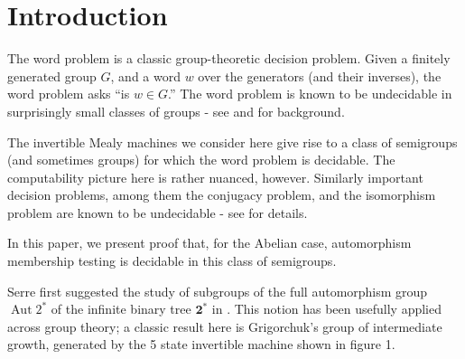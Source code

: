 \documentclass[11pt, titlepage]{article}
\begin{document}
\pagestyle{plain}
\title{\rmfamily\normalfont{}} \author{} \date{May 5, 2017}

\maketitle

\begin{abstract}
  We consider a variety of decision problems in groups and semigroups
  induced by invertible Mealy machines. Notably, we present proof
  that, in the Abelian case, the automorphism membership problem is
  decidable in these semigroups. In addition, we prove the
  undecidability of a Knapsack variant. A discussion of iteration and
  orbit rationality follows.
\end{abstract}

\tableofcontents

\section{Introduction}
The word problem is a classic group-theoretic decision problem. Given
a finitely generated group $G$, and a word $w$ over the generators
(and their inverses), the word problem asks ``is $w \in G$.'' The word
problem is known to be undecidable in surprisingly small classes of
groups - see \cite{Cain09:auto_sg} and \cite{Cain09:dec_prob} for background.

The invertible Mealy machines we consider here give rise to a class of
semigroups (and sometimes groups) for which the word problem is
decidable. The computability picture here is rather nuanced,
however. Similarly important decision problems, among them the
conjugacy problem, and the isomorphism problem are known to be
undecidable - see \cite{sunic:conj} for details.

In this paper, we present proof that, for the Abelian case,
automorphism membership testing is decidable in this class of
semigroups.

Serre first suggested the study of subgroups of the full automorphism
group $\operatorname{Aut}2^*$ of the infinite binary tree
$\textbf{2}^*$ in \cite{Serre:old}.  This notion has been usefully
applied across group theory; a classic result here is Grigorchuk's
group of intermediate growth, generated by the 5 state invertible
machine shown in figure 1.
\end{document}
